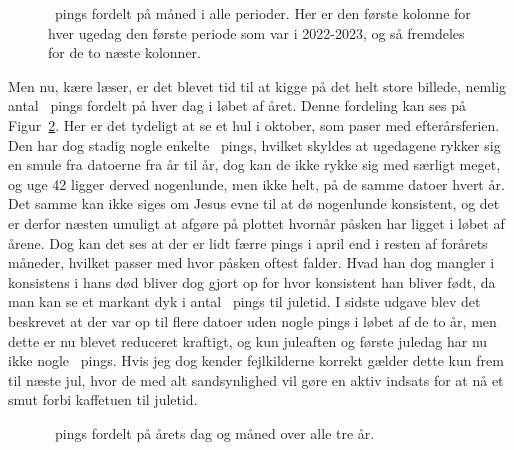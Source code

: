 \begin{article}
\begin{figure}[H]
	\centering
	\resizebox{\columnwidth}{!}{}
	\vspace{-25pt}
	\caption{\protect\coffee\ pings fordelt på måned i alle perioder. Her er den første kolonne for hver ugedag den første periode som var i 2022-2023, og så fremdeles for de to næste kolonner.}
	\label{fig:month_analysis_multi}
\end{figure}

Men nu, kære læser, er det blevet tid til at kigge på det helt store billede, nemlig antal \coffee\ pings fordelt på hver dag i løbet af året. Denne fordeling kan ses på Figur~\ref{fig:year_analysis_2024-2025}.
Her er det tydeligt at se et hul i oktober, som paser med efterårsferien. Den har dog stadig nogle enkelte \coffee\ pings, hvilket skyldes at ugedagene rykker sig en smule fra datoerne fra år til år, dog kan de ikke rykke sig med særligt meget, og uge 42 ligger derved nogenlunde, men ikke helt, på de samme datoer hvert år.
Det samme kan ikke siges om Jesus evne til at dø nogenlunde konsistent, og det er derfor næsten umuligt at afgøre på plottet hvornår påsken har ligget i løbet af årene. Dog kan det ses at der er lidt færre pings i april end i resten af forårets måneder, hvilket passer med hvor påsken oftest falder.
Hvad han dog mangler i konsistens i hans død bliver dog gjort op for hvor konsistent han bliver født, da man kan se et markant dyk i antal \coffee\ pings til juletid.
I sidste udgave blev det beskrevet at der var op til flere datoer uden nogle pings i løbet af de to år, men dette er nu blevet reduceret kraftigt, og kun juleaften og første juledag har nu ikke nogle \coffee\ pings. 
Hvis jeg dog kender fejlkilderne korrekt gælder dette kun frem til næste jul, hvor de med alt sandsynlighed vil gøre en aktiv indsats for at nå et smut forbi kaffetuen til juletid.

\begin{figure}[t!]
	\centering
	\resizebox{2\columnwidth}{!}{}
	\vspace{-20pt}
	\caption{\protect\coffee\ pings fordelt på årets dag og måned over alle tre år.}
	\label{fig:year_analysis_2024-2025}
\end{figure}


\end{article}
